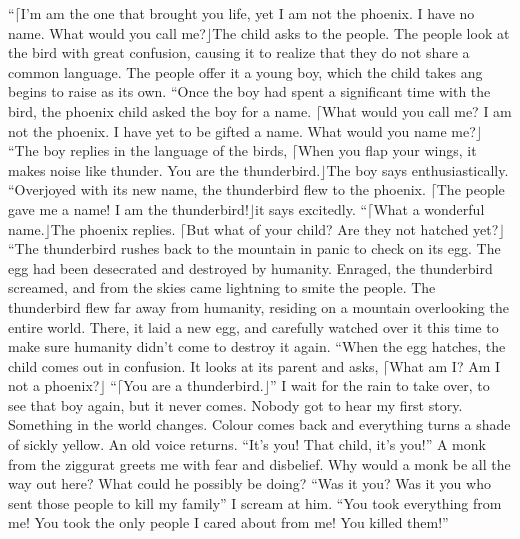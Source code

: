 \documentclass[openany, 12pt]{book}
\newcommand\bird[1]{$\lceil$#1$\rfloor$\tab}
\newcommand\tab[1][1cm]{\hspace*{#1}}
\begin{document}
\newline
\tab
``\bird{I’m am the one that brought you life, yet I am not the phoenix. I have no name. What would you call me?}The child asks to the people. The people look at the bird with great confusion, causing it to realize that they do not share a common language. The people offer it a young boy, which the child takes ang begins to raise as its own.
\newline
\tab
``Once the boy had spent a significant time with the bird, the phoenix child asked the boy for a name. \bird{What would you call me? I am not the phoenix. I have yet to be gifted a name. What would you name me?}
\newline
\tab
``The boy replies in the language of the birds, \bird{When you flap your wings, it makes noise like thunder. You are the thunderbird.}The boy says enthusiastically.
\newline
\tab
``Overjoyed with its new name, the thunderbird flew to the phoenix. \bird{The people gave me a name! I am the thunderbird!}it says excitedly.
\newline
\tab
``\bird{What a wonderful name.}The phoenix replies. \bird{But what of your child? Are they not hatched yet?}
\newline
\tab
``The thunderbird rushes back to the mountain in panic to check on its egg. The egg had been desecrated and destroyed by humanity. Enraged, the thunderbird screamed, and from the skies came lightning to smite the people. The thunderbird flew far away from humanity, residing on a mountain overlooking the entire world. There, it laid a new egg, and carefully watched over it this time to make sure humanity didn’t come to destroy it again.
\newline
\tab
``When the egg hatches, the child comes out in confusion. It looks at its parent and asks, \bird{What am I? Am I not a phoenix?}
``\bird{You are a thunderbird.}''
\newline
\tab
I wait for the rain to take over, to see that boy again, but it never comes. Nobody got to hear my first story. Something in the world changes. Colour comes back and everything turns a shade of sickly yellow. An old voice returns. ``It’s you! That child, it’s you!'' A monk from the ziggurat greets me with fear and disbelief.
\newline
\tab
Why would a monk be all the way out here? What could he possibly be doing? ``Was it you? Was it you who sent those people to kill my family\textinterrobang'' I scream at him. ``You took everything from me! You took the only people I cared about from me! You killed them!''
\end{document}
